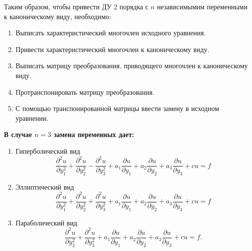 \documentclass[../main.tex]{subfiles}
\begin{document}
Таким образом, чтобы привести ДУ 2 порядка с $n$ независимымим переменными к каноническому виду, необходимо:
\begin{enumerate}
	\item Выписать характеристический многочлен исходного уравнения.
	\item Привести характеристический многочлен к каноническому виду.
	\item Выписать матрицу преобразования, приводящего многочлен к каноническому виду.
	\item Протранспонировать матрицу преобразования.
	\item С помощью транспонированной матрицы ввести замену в исходном уравнении.
\end{enumerate}
{\bf В случае $n=3$ замена переменных дает:
\begin{enumerate}
	\item Гиперболический вид
	      $$\frac{\partial^2 u }{\partial y_1 ^2} + \frac{\partial^2 u}{\partial y_2^2} - \frac{\partial^2 u}{\partial y_3^2} + a_1 \frac{\partial u}{\partial y_1} + a_2 \frac{\partial u}{\partial y_2} + a_3 \frac{\partial u}{\partial y_3} + cu = f$$
	\item Эллиптический вид
	      $$\frac{\partial^2 u }{\partial y_1 ^2} + \frac{\partial^2 u}{\partial y_2^2} + \frac{\partial^2 u}{\partial y_3^2} + a_1 \frac{\partial u}{\partial y_1} + a_2 \frac{\partial u}{\partial y_2} + a_3 \frac{\partial u}{\partial y_3} + cu = f$$
	\item Параболический вид
	      $$\frac{\partial^2 u}{\partial y_2^2} + \frac{\partial^2 u}{\partial y_3^2} + a_1 \frac{\partial u}{\partial y_1} + a_2 \frac{\partial u}{\partial y_2} + a_3 \frac{\partial u}{\partial y_3} + cu = f.$$
\end{enumerate}}
\end{document}
